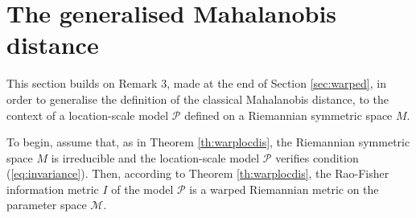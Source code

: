 \documentclass{svmult}
\begin{document}
\section{The generalised Mahalanobis distance} \label{sec:maha}
This section builds on Remark 3, made at the end of Section \ref{sec:warped}, in order to generalise the definition of the classical Mahalanobis distance, to the context of a location-scale model $\mathcal{P}$ defined on a Riemannian symmetric space $M$.

To begin, assume that, as in Theorem \ref{th:warplocdis}, the Riemannian symmetric space $M$ is irreducible and the location-scale model $\mathcal{P}$ verifies condition (\ref{eq:invariance}). Then, according to Theorem \ref{th:warplocdis}, the Rao-Fisher information metric $I$ of the model $\mathcal{P}$ is a warped Riemannian metric on the parameter space $\mathcal{M}$.
\end{document}
